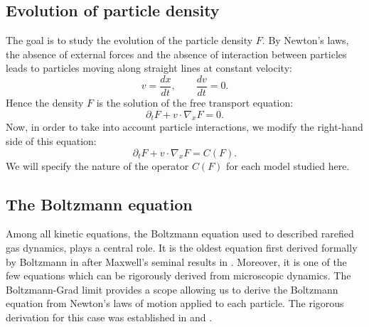 \subsection{Evolution of particle density} %
\label{sub:evolution_of_particle_density}
The goal is to study the evolution of the particle density $F$. By Newton's laws, the absence of external forces and the absence of interaction between particles leads to particles moving along straight lines at constant velocity:
\[v=\frac{dx}{dt},\qquad \frac{dv}{dt}=0.\]
Hence the density $F$ is the solution of the free transport equation:
\[\partial_t F+ v\cdot \nabla_x F=0.\]
Now, in order to take into account particle interactions, we modify the right-hand side of this equation:
\[\partial_t F+ v\cdot \nabla_x F=C(F).\]
We will specify the nature of the operator $C(F)$ for each  model studied here.
\subsection{The Boltzmann equation} %
\label{ssec:the_boltzmann_equation}
Among all kinetic equations, the Boltzmann equation used to described rarefied gas dynamics, plays a central role. It is the oldest equation first derived formally by Boltzmann in \cite{Boltzmann1872Weitere} after Maxwell's seminal results in \cite{maxwell1867dynamical}. Moreover, it is one of the few equations which can be rigorously derived from microscopic dynamics. The Boltzmann-Grad \cite{Grad1949On} limit provides a scope allowing us to derive the Boltzmann equation from Newton's laws of motion applied to each particle. The rigorous derivation for this case was established in \cite{Lanford1975Time} and \cite{Gallagher2013From}.

